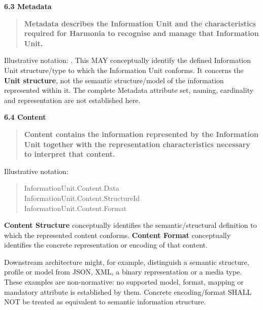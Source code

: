 \par\medskip\textbf{6.3 Metadata}\par


\begin{quote}


\textbf{Metadata describes the Information Unit and the characteristics required for Harmonia to recognise and manage that Information Unit.}



\end{quote}


Illustrative notation: \texttt{}. This MAY
conceptually identify the defined Information Unit structure/type to which the
Information Unit conforms. It concerns the \textbf{Unit structure}, not the semantic
structure/model of the information represented within it. The complete Metadata
attribute set, naming, cardinality and representation are not established here.



\par\medskip\textbf{6.4 Content}\par


\begin{quote}


\textbf{Content contains the information represented by the Information Unit together with the representation characteristics necessary to interpret that content.}



\end{quote}


Illustrative notation:



\begin{quote}\small\ttfamily
InformationUnit.Content.Data\\
InformationUnit.Content.StructureId\\
InformationUnit.Content.Format\\

\end{quote}


\textbf{Content Structure} conceptually identifies the semantic/structural definition
to which the represented content conforms. \textbf{Content Format} conceptually
identifies the concrete representation or encoding of that content.



Downstream architecture might, for example, distinguish a semantic structure,
profile or model from JSON, XML, a binary representation or a media type. These
examples are non-normative: no supported model, format, mapping or mandatory
attribute is established by them. Concrete encoding/format SHALL NOT be treated
as equivalent to semantic information structure.



